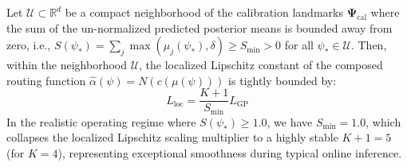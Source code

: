 \begin{proposition}
\label{prop:localized_lipschitz}
Let $\mathcal{U} \subset \mathbb{R}^d$ be a compact neighborhood of the calibration landmarks $\mathbf{\Psi}_{\text{cal}}$ where the sum of the un-normalized predicted posterior means is bounded away from zero, i.e., $S(\psi_*) = \sum_j \max(\mu_j(\psi_*), \delta) \ge S_{\min} > 0$ for all $\psi_* \in \mathcal{U}$. Then, within the neighborhood $\mathcal{U}$, the localized Lipschitz constant of the composed routing function $\hat{\alpha}(\psi) = N(c(\mu(\psi)))$ is tightly bounded by:
\begin{equation}
L_{\text{loc}} = \frac{K+1}{S_{\min}} L_{\text{GP}}
\label{eq:loc_lipschitz}
\end{equation}
In the realistic operating regime where $S(\psi_*) \ge 1.0$, we have $S_{\min} = 1.0$, which collapses the localized Lipschitz scaling multiplier to a highly stable $K+1 = 5$ (for $K=4$), representing exceptional smoothness during typical online inference.
\end{proposition}
